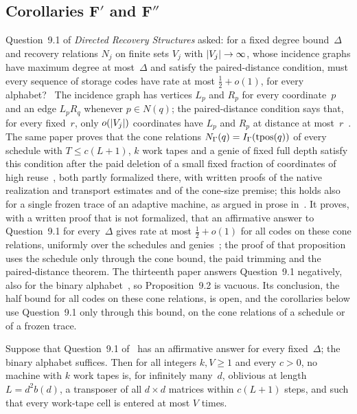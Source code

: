 \subsection{Corollaries F\texorpdfstring{$'$}{'} and F\texorpdfstring{$''$}{''}}\label{sec:trans-Fprime}

Question~9.1 of \emph{Directed Recovery Structures} asked: for a fixed degree bound~$\Delta$ and recovery relations $N_j$ on
finite sets $V_j$ with $\lvert V_j \rvert\to\infty$, whose incidence graphs have maximum degree at most~$\Delta$ and satisfy
the paired-distance condition, must every sequence of storage codes have rate at most $\frac12+o(1)$, for every
alphabet?~\cite[Question~9.1]{DirectedRecovery2026} The incidence graph has vertices $L_p$ and $R_p$ for every
coordinate~$p$ and an edge $L_pR_q$ whenever $p\in N(q)$; the paired-distance condition says that, for every fixed~$r$, only
$o(\lvert V_j \rvert)$ coordinates have $L_p$ and $R_p$ at distance at most~$r$~\cite[Definition~2.3]{DirectedRecovery2026}. The
same paper proves that the cone relations $N_\Gamma(q)=I_\Gamma(\operatorname{tpos}(q))$ of every schedule with $T\le c(L+1)$, $k$ work
tapes and a genie of fixed full depth satisfy this condition after the paid deletion of a small fixed fraction of
coordinates of high reuse~\cite[Theorem~3.3 and Corollary~3.8]{DirectedRecovery2026}, both partly formalized there, with
written proofs of the native realization and transport estimates and of the cone-size premise; this holds also for a single
frozen trace of an adaptive machine, as argued in prose in~\cite[Remark~3.9]{DirectedRecovery2026}. It proves, with a written
proof that is not formalized, that an affirmative answer to Question~9.1 for every~$\Delta$ gives rate at most
$\frac12+o(1)$ for all codes on these cone relations, uniformly over the schedules and
genies~\cite[Proposition~9.2]{DirectedRecovery2026}; the proof of that proposition uses the schedule only through the cone
bound, the paid trimming and the paired-distance theorem. The thirteenth paper answers Question~9.1 negatively, also for the
binary alphabet~\cite[Theorem~A and Corollary~A$'$]{StorageCodes2026}, so Proposition~9.2 is vacuous. Its conclusion, the
half bound for all codes on these cone relations, is open, and the corollaries below use Question~9.1 only through this
bound, on the cone relations of a schedule or of a frozen trace.

\begin{corollary}\label{cor:Fprime}
\notformalized
Suppose that Question~9.1 of~\cite{DirectedRecovery2026} has an affirmative answer for every fixed~$\Delta$; the binary
alphabet suffices. Then for all integers $k,V\ge1$ and every $c>0$, no machine with $k$ work tapes is, for infinitely
many~$d$, oblivious at length $L=d^2b(d)$, a transposer of all $d\times d$ matrices within $c(L+1)$ steps, and such that
every work-tape cell is entered at most $V$ times.
\end{corollary}

